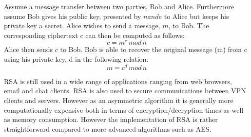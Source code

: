 Assume a message transfer between two parties, Bob and Alice. Furthermore assume Bob gives his public key, presented by $n and e$ to Alice but keeps his private key a secret. Alice wishes to send a message, $m$, to Bob. The corresponding ciphertext $c$ can then be computed as follows:
\[ c = m^e\,mod\,n\]
Alice then sends $c$ to Bob. Bob is able to recover the original message (m) from c using his private key, d in the following relation:
\[ m = c^d\,mod\,n\]

RSA is still used in a wide range of applications ranging from web browsers, email and chat clients. RSA is also used to secure communications between VPN clients and servers. However as an asymmetric algorithm it is generally more computationally expensive both in terms of encryption/decryption times as well as memory consumption. However the implementation of RSA is rather straightforward compared to more advanced algorithms such as AES.  
